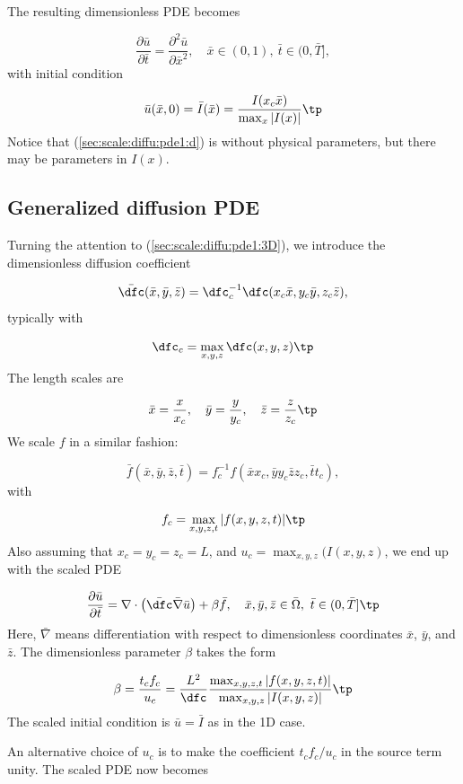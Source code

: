 \documentclass[graybox,envcountchap,sectrefs,final]{svmonodo}
\begin{document}
The resulting dimensionless PDE becomes

\begin{equation}
\frac{\partial \bar u}{\partial \bar t} =
\frac{\partial^2 \bar u}{\partial \bar x^2}, \quad  \bar x\in (0,1),\ \bar t\in (0,\bar T],
\label{sec:scale:diffu:pde1:d}
\end{equation}
with initial condition

\[ \bar u(\bar x, 0) = \bar I(\bar x) = \frac{I(x_c\bar x)}{\max_x |I(x)|}\tp\]
Notice that (\ref{sec:scale:diffu:pde1:d}) is without physical parameters,
but there may be parameters in $I(x)$.

\subsection{Generalized diffusion PDE}

Turning the attention to (\ref{sec:scale:diffu:pde1:3D}), we introduce
the dimensionless diffusion coefficient

\[ \bar\dfc(\bar x,\bar y,\bar z) =
\dfc_c^{-1}\dfc (x_c\bar x, y_c\bar y, z_c\bar z),\]
typically with

\[ \dfc_c = \max_{x,y,z}\dfc(x,y,z)\tp\]
The length scales are

\[ \bar x = \frac{x}{x_c},\quad \bar y = \frac{y}{y_c},\quad
\bar z = \frac{z}{z_c}\tp
\]
We scale $f$ in a similar fashion:

\[ \bar f(\bar x, \bar y, \bar z, \bar t)
= f_c^{-1}f(\bar xx_c, \bar yy_c \bar zz_c, \bar tt_c),\]
with

\[ f_c = \max_{x,y,z,t}|f(x,y,z,t)|\tp\]
Also assuming
that $x_c=y_c=z_c=L$, and $u_c=\max_{x,y,z}(I(x,y,z)$,
we end up with the scaled PDE

\begin{equation}
\frac{\partial \bar u}{\partial \bar t} =
\nabla\cdot\left(\bar\dfc \bar\nabla \bar u\right) + \beta\bar f, \quad  \bar x,\bar y,\bar z\in \bar \Omega,\ \bar t\in (0,\bar T]\tp
\label{sec:scale:diffu:pde1:3D:d}
\end{equation}
Here, $\bar\nabla$ means differentiation with respect to dimensionless
coordinates $\bar x$, $\bar y$, and $\bar z$. The dimensionless parameter
$\beta$ takes the form

\[ \beta = \frac{t_cf_c}{u_c} = \frac{L^2}{\dfc}
\frac{\max_{x,y,z,t}|f(x,y,z,t)|}{\max_{x,y,z}|I(x,y,z)|}\tp\]
The scaled initial condition is $\bar u = \bar I$ as in the 1D case.

An alternative choice of $u_c$ is to make the coefficient $t_cf_c/u_c$
in the source term unity. The scaled PDE now becomes
\end{document}
